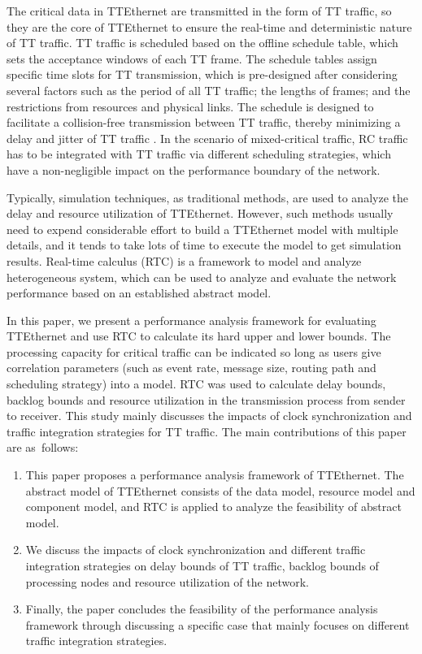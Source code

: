 \documentclass[electronics,article,accept,moreauthors,pdftex]{Definitions/mdpi}
\begin{document}
The critical data in TTEthernet are transmitted in the form of TT traffic, so they are the core of TTEthernet to ensure the real-time and deterministic nature of TT traffic. TT traffic is scheduled based on the offline schedule table, which sets the acceptance windows of each TT frame. The schedule tables assign specific time slots for TT transmission, which is pre-designed after considering several factors such as the period of all TT traffic; the lengths of frames; and the restrictions from resources and physical links. The schedule is designed to facilitate a collision-free transmission between TT traffic, thereby minimizing a delay and jitter of TT traffic \cite{suethanuwong2012scheduling}. In the scenario of mixed-critical traffic, RC traffic has to be integrated with TT traffic via different scheduling strategies, which have a non-negligible impact on the performance boundary of the network.

Typically, simulation techniques, as traditional methods, are used to analyze the delay and resource utilization of TTEthernet. However, such methods usually need to expend considerable effort to build a TTEthernet model with multiple details, and it tends to take lots of time to execute the model to get simulation results. Real-time calculus (RTC) is a framework to model and analyze heterogeneous system, which can be used to analyze and evaluate the network performance based on an established abstract model.

In this paper, we present a performance analysis framework for evaluating TTEthernet and use RTC to calculate its hard upper and lower bounds. The processing capacity for critical traffic can be indicated so long as users give correlation parameters (such as event rate, message size, routing path and scheduling strategy) into a model. RTC was used to calculate delay bounds, backlog bounds and resource utilization in the transmission process from sender to receiver. This study mainly discusses the impacts of clock synchronization and traffic integration strategies for TT traffic. The main contributions of this paper are as~follows:
\begin{enumerate}[leftmargin=*,labelsep=4.9mm]
\item	This paper proposes a performance analysis framework of TTEthernet. The abstract model of TTEthernet consists of the data model, resource model and component model, and RTC is applied to analyze the feasibility of abstract model.
\item	We discuss the impacts of clock synchronization and different traffic integration strategies on delay bounds of TT traffic, backlog bounds of processing nodes and resource utilization of the network.
\item	Finally, the paper concludes the feasibility of the performance analysis framework through discussing a specific case that mainly focuses on different traffic integration strategies.
\end{enumerate}
\end{document}
